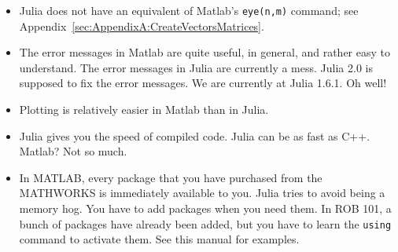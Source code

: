 \begin{itemize}
    \item Julia does not have an equivalent of Matlab's \texttt{eye(n,m)} command; see Appendix~\ref{sec:AppendixA:CreateVectorsMatrices}. 
    \item The error messages in Matlab are quite useful, in general, and rather easy to understand. The error messages in Julia are currently a mess. Julia 2.0 is supposed to fix the error messages. We are currently at Julia 1.6.1. Oh well! 
    \item Plotting is relatively easier in Matlab than in Julia. 
    \item Julia gives you the speed of compiled code. Julia can be as fast as C++. Matlab? Not so much.
    \item In MATLAB, every package that you have purchased from the MATHWORKS is immediately available to you. Julia tries to avoid being a memory hog. You have to add packages when you need them. In ROB 101, a bunch of packages have already been added, but you have to learn the \texttt{using} command to activate them. See this manual for examples.   
\end{itemize}
